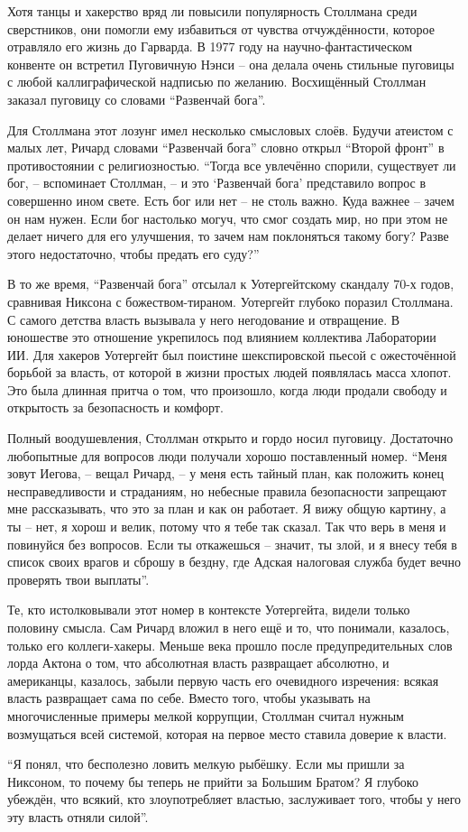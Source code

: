Хотя танцы и хакерство вряд ли повысили популярность Столлмана среди сверстников, они помогли ему избавиться от чувства отчуждённости, которое отравляло его жизнь до Гарварда. В 1977 году на научно-фантастическом конвенте он встретил Пуговичную Нэнси -- она делала очень стильные пуговицы с любой каллиграфической надписью по желанию. Восхищённый Столлман заказал пуговицу со словами \enquote{Развенчай бога}.

Для Столлмана этот лозунг имел несколько смысловых слоёв. Будучи атеистом с малых лет, Ричард словами \enquote{Развенчай бога} словно открыл \enquote{Второй фронт} в противостоянии с религиозностью. \enquote{Тогда все увлечённо спорили, существует ли бог, -- вспоминает Столлман, -- и это \enquote{Развенчай бога} представило вопрос в совершенно ином свете. Есть бог или нет -- не столь важно. Куда важнее -- зачем он нам нужен. Если бог настолько могуч, что смог создать мир, но при этом не делает ничего для его улучшения, то зачем нам поклоняться такому богу? Разве этого недостаточно, чтобы предать его суду?}

В то же время, \enquote{Развенчай бога} отсылал к Уотергейтскому скандалу 70-х годов, сравнивая Никсона с божеством-тираном. Уотергейт глубоко поразил Столлмана. С самого детства власть вызывала у него негодование и отвращение. В юношестве это отношение укрепилось под влиянием коллектива Лаборатории ИИ. Для хакеров Уотергейт был поистине шекспировской пьесой с ожесточённой борьбой за власть, от которой в жизни простых людей появлялась масса хлопот. Это была длинная притча о том, что произошло, когда люди продали свободу и открытость за безопасность и комфорт.

Полный воодушевления, Столлман открыто и гордо носил пуговицу. Достаточно любопытные для вопросов люди получали хорошо поставленный номер. \enquote{Меня зовут Иегова, -- вещал Ричард, -- у меня есть тайный план, как положить конец несправедливости и страданиям, но небесные правила безопасности запрещают мне рассказывать, что это за план и как он работает. Я вижу общую картину, а ты -- нет, я хорош и велик, потому что я тебе так сказал. Так что верь в меня и повинуйся без вопросов. Если ты откажешься -- значит, ты злой, и я внесу тебя в список своих врагов и сброшу в бездну, где Адская налоговая служба будет вечно проверять твои выплаты}.

Те, кто истолковывали этот номер в контексте Уотергейта, видели только половину смысла. Сам Ричард вложил в него ещё и то, что понимали, казалось, только его коллеги-хакеры. Меньше века прошло после предупредительных слов лорда Актона о том, что абсолютная власть развращает абсолютно, и американцы, казалось, забыли первую часть его очевидного изречения: всякая власть развращает сама по себе. Вместо того, чтобы указывать на многочисленные примеры мелкой коррупции, Столлман считал нужным возмущаться всей системой, которая на первое место ставила доверие к власти.

\enquote{Я понял, что бесполезно ловить мелкую рыбёшку. Если мы пришли за Никсоном, то почему бы теперь не прийти за Большим Братом? Я глубоко убеждён, что всякий, кто злоупотребляет властью, заслуживает того, чтобы у него эту власть отняли силой}.
